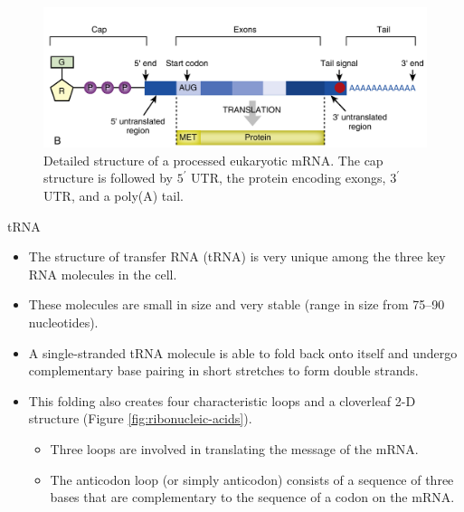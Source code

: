 \documentclass[11pt,ignorenonframetext,aspectratio=169]{beamer}
\providecommand{\tightlist}{%
  \setlength{\itemsep}{0pt}\setlength{\parskip}{0pt}}
\begin{document}
\begin{frame}{}
\protect\hypertarget{section-7}{}

\begin{figure}
\includegraphics[width=0.65\linewidth]{../images/mrna_processed} \caption{Detailed structure of a processed eukaryotic mRNA. The cap structure is followed by $5^\prime$ UTR, the protein encoding exongs, $3^\prime$ UTR, and a poly(A) tail.}\label{fig:mrna-processed}
\end{figure}

\end{frame}

\begin{frame}{tRNA}
\protect\hypertarget{trna}{}

\begin{itemize}
\tightlist
\item
  The structure of transfer RNA (tRNA) is very unique among the three
  key RNA molecules in the cell.
\item
  These molecules are small in size and very stable (range in size from
  75--90 nucleotides).
\item
  A single-stranded tRNA molecule is able to fold back onto itself and
  undergo complementary base pairing in short stretches to form double
  strands.
\item
  This folding also creates four characteristic loops and a cloverleaf
  2-D structure (Figure \ref{fig:ribonucleic-acids}).

  \begin{itemize}
  \tightlist
  \item
    Three loops are involved in translating the message of the mRNA.
  \item
    The anticodon loop (or simply anticodon) consists of a sequence of
    three bases that are complementary to the sequence of a codon on the
    mRNA.
  \end{itemize}
\end{itemize}

\end{frame}
\end{document}
